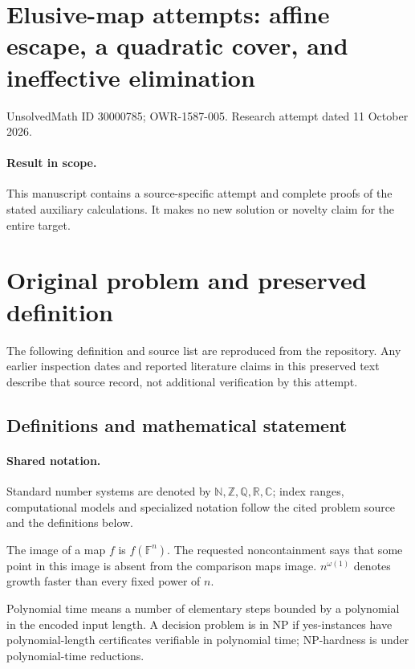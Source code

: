 \documentclass[11pt]{article}
\begin{document}
\section*{Elusive-map attempts: affine escape, a quadratic cover, and ineffective elimination}
\noindent UnsolvedMath ID 30000785; OWR-1587-005. Research attempt dated 11 October 2026.
\paragraph{Result in scope.}This manuscript contains a source-specific attempt and complete proofs of the stated auxiliary calculations. It makes no new solution or novelty claim for the entire target.
\section{Original problem and preserved definition}
The following definition and source list are reproduced from the repository. Any earlier inspection dates and reported literature claims in this preserved text describe that source record, not additional verification by this attempt.
\subsection{Definitions and mathematical statement}

\paragraph{Shared notation.}Standard number systems are denoted by $\mathbb N,\mathbb Z,\mathbb Q,\mathbb R,\mathbb C$; index ranges, computational models and specialized notation follow the cited problem source and the definitions below.


The image of a map $f$ is $f(\mathbb F^n)$. The requested noncontainment says that some point in this image is absent from the comparison map\textquotesingle s image. $n^{\omega(1)}$ denotes growth faster than every fixed power of $n$.

Polynomial time means a number of elementary steps bounded by a polynomial in the encoded input length. A decision problem is in $\mathrm{NP}$ if yes-instances have polynomial-length certificates verifiable in polynomial time; NP-hardness is under polynomial-time reductions.
\end{document}
